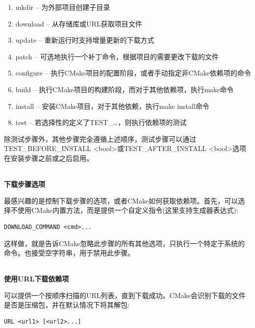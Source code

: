\begin{enumerate}
\item 
mkdir – 为外部项目创建子目录

\item 
download – 从存储库或URL获取项目文件

\item 
update – 重新运行时支持增量更新的下载方式

\item 
patch – 可选地执行一个补丁命令，根据项目的需要更改下载的文件

\item 
configure – 执行CMake项目的配置阶段，或者手动指定非CMake依赖项的命令

\item 
build – 执行CMake项目的构建阶段，而对于其他依赖项，执行make命令

\item 
install – 安装CMake项目，对于其他依赖，执行make install命令

\item 
test – 若选择性的定义了TEST\_…，则执行依赖项的测试
\end{enumerate}

除测试步骤外，其他步骤完全遵循上述顺序，测试步骤可以通过TEST\_BEFORE\_INSTALL <bool>或TEST\_AFTER\_INSTALL <bool>选项在安装步骤之前或之后启用。

\hspace*{\fill} \\ %
\noindent
\textbf{下载步骤选项}

最感兴趣的是控制下载步骤的选项，或者CMake如何获取依赖项。首先，可以选择不使用CMake内置方法，而是提供一个自定义指令(这里支持生成器表达式):

\begin{lstlisting}[style=styleCMake]
DOWNLOAD_COMMAND <cmd>...
\end{lstlisting} 

这样做，就是告诉CMake忽略此步骤的所有其他选项，只执行一个特定于系统的命令。也接受空字符串，用于禁用此步骤。

\hspace*{\fill} \\ %
\noindent
\textbf{使用URL下载依赖项}

可以提供一个按顺序扫描的URL列表，直到下载成功。CMake会识别下载的文件是否是压缩包，并在默认情况下将其解包:

\begin{lstlisting}[style=styleCMake]
URL <url1> [<url2>...]
\end{lstlisting} 

